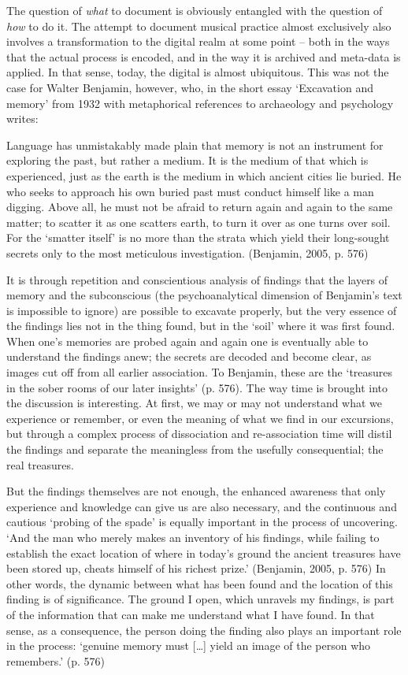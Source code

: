 The question of \emph{what} to document is obviously entangled with the
question of \emph{how} to do it. The attempt to document musical
practice almost exclusively also involves a transformation to the
digital realm at some point -- both in the ways that the actual process
is encoded, and in the way it is archived and meta-data is applied. In
that sense, today, the digital is almost ubiquitous. This was not the
case for Walter Benjamin, however, who, in the short essay `Excavation
and memory' from 1932 with metaphorical references to archaeology and
psychology writes:

Language has unmistakably made plain that memory is not an instrument
for exploring the past, but rather a medium. It is the medium of that
which is experienced, just as the earth is the medium in which ancient
cities lie buried. He who seeks to approach his own buried past must
conduct himself like a man digging. Above all, he must not be afraid to
return again and again to the same matter; to scatter it as one scatters
earth, to turn it over as one turns over soil. For the `smatter itself'
is no more than the strata which yield their long-sought secrets only to
the most meticulous investigation. (Benjamin, 2005, p. 576)

It is through repetition and conscientious analysis of findings that the
layers of memory and the subconscious (the psychoanalytical dimension of
Benjamin's text is impossible to ignore) are possible to excavate
properly, but the very essence of the findings lies not in the thing
found, but in the `soil' where it was first found. When one's memories
are probed again and again one is eventually able to understand the
findings anew; the secrets are decoded and become clear, as images cut
off from all earlier association. To Benjamin, these are the `treasures
in the sober rooms of our later insights' (p. 576). The way time is
brought into the discussion is interesting. At first, we may or may not
understand what we experience or remember, or even the meaning of what
we find in our excursions, but through a complex process of dissociation
and re-association time will distil the findings and separate the
meaningless from the usefully consequential; the real treasures.

But the findings themselves are not enough, the enhanced awareness that
only experience and knowledge can give us are also necessary, and the
continuous and cautious `probing of the spade' is equally important in
the process of uncovering. `And the man who merely makes an inventory of
his findings, while failing to establish the exact location of where in
today's ground the ancient treasures have been stored up, cheats himself
of his richest prize.' (Benjamin, 2005, p. 576) In other words, the
dynamic between what has been found and the location of this finding is
of significance. The ground I open, which unravels my findings, is part
of the information that can make me understand what I have found. In
that sense, as a consequence, the person doing the finding also plays an
important role in the process: `genuine memory must {[}\ldots{}{]} yield
an image of the person who remembers.' (p. 576)


